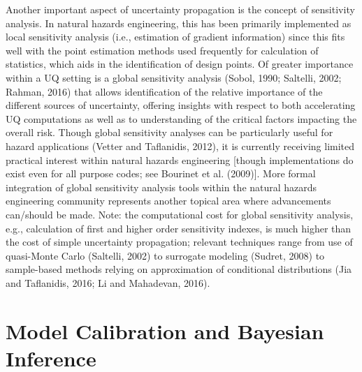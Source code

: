 Another important aspect of uncertainty propagation is the concept of sensitivity analysis. In natural hazards engineering, this has been primarily implemented as local sensitivity analysis (i.e., estimation of gradient information) since this fits well with the point estimation methods used frequently for calculation of statistics, which aids in the identification of design points. Of greater importance within a UQ setting is a global sensitivity analysis (Sobol, 1990; Saltelli, 2002; Rahman, 2016) that allows identification of the relative importance of the different sources of uncertainty, offering insights with respect to both accelerating UQ computations as well as to understanding of the critical factors impacting the overall risk. Though global sensitivity analyses can be particularly useful for hazard applications (Vetter and Taflanidis, 2012), it is currently receiving limited practical interest within natural hazards engineering [though implementations do exist even for all purpose codes; see Bourinet et al. (2009)]. More formal integration of global sensitivity analysis tools within the natural hazards engineering community represents another topical area where advancements can/should be made. Note: the computational cost for global sensitivity analysis, e.g., calculation of first and higher order sensitivity indexes, is much higher than the cost of simple uncertainty propagation; relevant techniques range from use of quasi-Monte Carlo (Saltelli, 2002) to surrogate modeling (Sudret, 2008) to sample-based methods relying on approximation of conditional distributions (Jia and Taflanidis, 2016; Li and Mahadevan, 2016).

\section{Model Calibration and Bayesian Inference}
\label{sec:uq_calibration}

